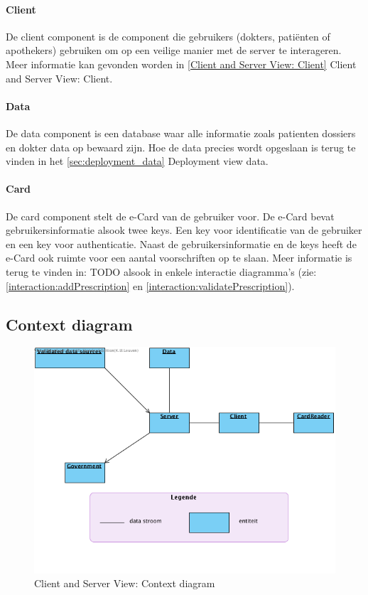 \documentclass[a4paper,10pt]{article}
\begin{document}
\paragraph{Client}
De client component is de component die gebruikers (dokters, pati\"{e}nten of apothekers) gebruiken om op een veilige manier met de server te interageren.  Meer informatie kan gevonden worden in \ref{Client and Server View: Client} Client and Server View: Client.

\paragraph{Data}
De data component is een database waar alle informatie zoals patienten dossiers en dokter data op bewaard zijn.  Hoe de data precies wordt opgeslaan is terug te vinden in het \ref{sec:deployment_data} Deployment view data.

\paragraph{Card}
De card component stelt de e-Card van de gebruiker voor.  De e-Card bevat gebruikersinformatie alsook twee keys.  Een key voor identificatie van de gebruiker en een key voor authenticatie.  Naast de gebruikersinformatie en de keys heeft de e-Card ook ruimte voor een aantal voorschriften op te slaan.  Meer informatie is terug te vinden in: TODO alsook in enkele interactie diagramma's (zie: \ref{interaction:addPrescription} en \ref{interaction:validatePrescription}).

\subsection{Context diagram}

\begin{figure}[!ht]
  \includegraphics[width=\textwidth]{../images/ClientServer_Context.png}
  \caption{Client and Server View: Context diagram}
\end{figure}
\end{document}
